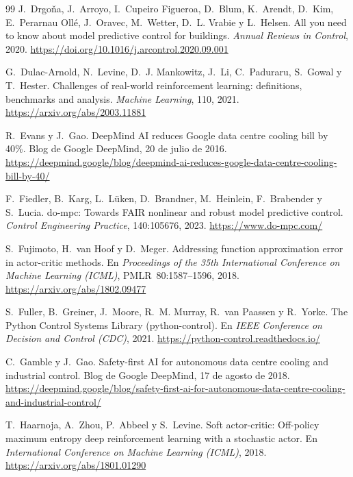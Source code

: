 \begin{thebibliography}{99}
J.~Drgoňa, J.~Arroyo, I.~Cupeiro Figueroa, D.~Blum, K.~Arendt, D.~Kim, E.~Perarnau Ollé, J.~Oravec, M.~Wetter, D.~L. Vrabie y L.~Helsen.
\newblock All you need to know about model predictive control for buildings.
\newblock \emph{Annual Reviews in Control}, 2020.
\newblock \url{https://doi.org/10.1016/j.arcontrol.2020.09.001}

G.~Dulac-Arnold, N.~Levine, D.~J. Mankowitz, J.~Li, C.~Paduraru, S.~Gowal y T.~Hester.
\newblock Challenges of real-world reinforcement learning: definitions, benchmarks and analysis.
\newblock \emph{Machine Learning}, 110, 2021.
\newblock \url{https://arxiv.org/abs/2003.11881}

R.~Evans y J.~Gao.
\newblock DeepMind AI reduces Google data centre cooling bill by 40\%.
\newblock Blog de Google DeepMind, 20 de julio de 2016.
\newblock \url{https://deepmind.google/blog/deepmind-ai-reduces-google-data-centre-cooling-bill-by-40/}

F.~Fiedler, B.~Karg, L.~Lüken, D.~Brandner, M.~Heinlein, F.~Brabender y S.~Lucia.
\newblock do-mpc: Towards FAIR nonlinear and robust model predictive control.
\newblock \emph{Control Engineering Practice}, 140:105676, 2023.
\newblock \url{https://www.do-mpc.com/}

S.~Fujimoto, H.~van Hoof y D.~Meger.
\newblock Addressing function approximation error in actor-critic methods.
\newblock En \emph{Proceedings of the 35th International Conference on Machine Learning (ICML)}, PMLR~80:1587--1596, 2018.
\newblock \url{https://arxiv.org/abs/1802.09477}

S.~Fuller, B.~Greiner, J.~Moore, R.~M. Murray, R.~van Paassen y R.~Yorke.
\newblock The Python Control Systems Library (python-control).
\newblock En \emph{IEEE Conference on Decision and Control (CDC)}, 2021.
\newblock \url{https://python-control.readthedocs.io/}

C.~Gamble y J.~Gao.
\newblock Safety-first AI for autonomous data centre cooling and industrial control.
\newblock Blog de Google DeepMind, 17 de agosto de 2018.
\newblock \url{https://deepmind.google/blog/safety-first-ai-for-autonomous-data-centre-cooling-and-industrial-control/}

T.~Haarnoja, A.~Zhou, P.~Abbeel y S.~Levine.
\newblock Soft actor-critic: Off-policy maximum entropy deep reinforcement learning with a stochastic actor.
\newblock En \emph{International Conference on Machine Learning (ICML)}, 2018.
\newblock \url{https://arxiv.org/abs/1801.01290}


\end{thebibliography}
